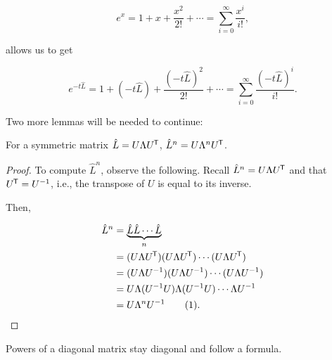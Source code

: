 \begin{equation}
	e^{x} = 1 + x + \frac{x^{2}}{2!} + \cdots = \sum_{i=0}^{\infty} \frac{x^{i}}{i!},
\end{equation}

\noindent allows us to get

\begin{equation}
	e^{-t\hat{L}} = 1 + (-t\hat{L}) + \frac{(-t\hat{L})^{2}}{2!} + \cdots = \sum_{i=0}^{\infty} \frac{(-t\hat{L})^{i}}{i!}.
\end{equation}


\noindent Two more lemmas will be needed to continue:

\begin{lemma}
For a symmetric matrix \(\hat{L} = U\Lambda U^{\mkern-1.5mu\mathsf{T}}\), \(\hat{L}^{n} = U\Lambda^{n} U^{\mkern-1.5mu\mathsf{T}}\).\label{lemma:exp}
\end{lemma}

\begin{proof}
To compute \(\hat{L}^{n}\), observe the following. Recall \(\hat{L}^{n} = U\Lambda U^{\mkern-1.5mu\mathsf{T}}\) and that \(U^{\mkern-1.5mu\mathsf{T}} = U^{-1}\), i.e., the transpose of \(U\) is equal to its inverse.

\noindent Then,

\begin{align*}
\hat{L}^{n} & = \underbrace{\hat{L}\hat{L}\cdots \hat{L}}_{n}\\
& = (U\Lambda U\tran)(U\Lambda U\tran)\cdots (U\Lambda U\tran)\\
& = (U\Lambda U^{-1})(U\Lambda U^{-1}) \cdots (U\Lambda U^{-1})\\
& = U\Lambda(U^{-1}U)\Lambda(U^{-1}U) \cdots \Lambda U^{-1}\\
& = U\Lambda^{n} U^{-1}\refstepcounter{equation}\tag{\theequation}.
\end{align*}
\end{proof}

\begin{lemma}
Powers of a diagonal matrix stay diagonal and follow a formula.\label{lemma:diagpowers}
\end{lemma}

